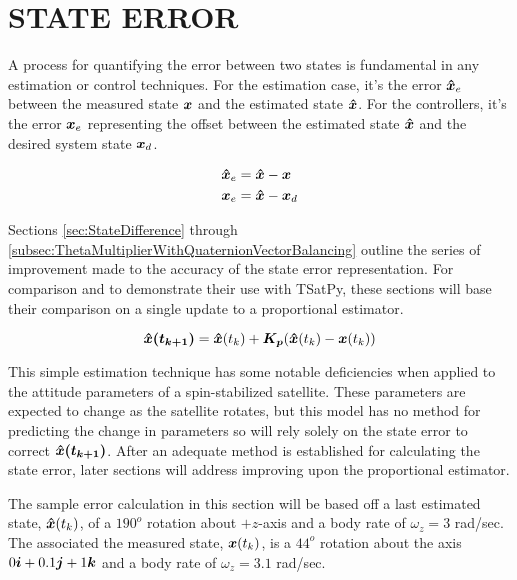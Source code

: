 
\chapter{STATE ERROR}
\label{chap:StateError}

A process for quantifying the error between two states is fundamental in any estimation or control techniques.  For the estimation case, it's the error $\boldsymbol{\hat{x}}_e$ between the measured state $\boldsymbol{x}$ and the estimated state $\boldsymbol{\hat{x}}$.  For the controllers, it's the error $\boldsymbol{x}_e$ representing the offset between the estimated state $\boldsymbol{\hat{x}}$ and the desired system state $\boldsymbol{x}_d$.

\begin{subequations}
  \begin{align}
    \boldsymbol{\hat{x}}_e &= \boldsymbol{\hat{x}} - \boldsymbol{x} \\
    \boldsymbol{x}_e &= \boldsymbol{\hat{x}} - \boldsymbol{x}_d
  \end{align}
  \label{eqn:StateError}
\end{subequations}

Sections \ref{sec:StateDifference} through \ref{subsec:ThetaMultiplierWithQuaternionVectorBalancing} outline the series of improvement made to the accuracy of the state error representation.  For comparison and to demonstrate their use with TSatPy, these sections will base their comparison on a single update to a proportional estimator.

\begin{equation}
  \boldsymbol{\hat{x}(t_{k+1})} = \boldsymbol{\hat{x}}(t_{k}) + \boldsymbol{K_p} ( \boldsymbol{\hat{x}}(t_{k}) - \boldsymbol{x}(t_{k}) )
  \label{eqn:PEstimatorStateDiff}
\end{equation}

This simple estimation technique has some notable deficiencies when applied to the attitude parameters of a spin-stabilized satellite.  These parameters are expected to change as the satellite rotates, but this model has no method for predicting the change in parameters so will rely solely on the state error to correct $\boldsymbol{\hat{x}(t_{k+1})}$.  After an adequate method is established for calculating the state error, later sections will address improving upon the proportional estimator.

The sample error calculation in this section will be based off a last estimated state, $\boldsymbol{\hat{x}}(t_{k})$, of a $190^o$ rotation about $+z$-axis and a body rate of $\omega_z = 3$ rad/sec.  The associated the measured state, $\boldsymbol{x}(t_{k})$, is a $44^o$ rotation about the axis $0 \boldsymbol{i} + 0.1 \boldsymbol{j} + 1\boldsymbol{k}$ and a body rate of $\omega_z = 3.1$ rad/sec.


